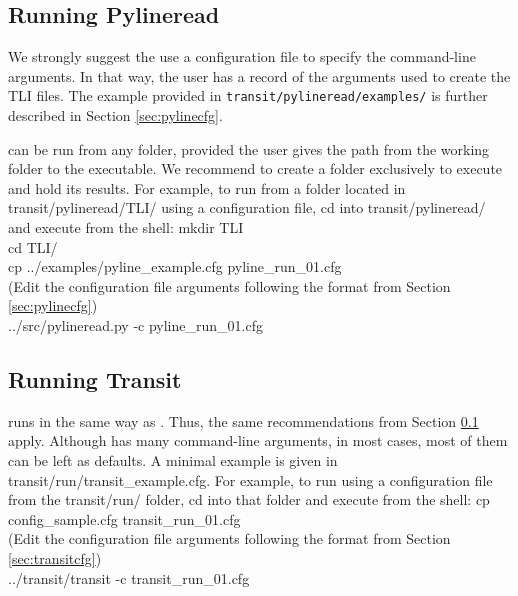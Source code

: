 \documentclass[letterpaper, 12pt]{article}
\begin{document}
\subsection{Running Pylineread}
\label{sec:runpyline}

We strongly suggest the use a configuration file to specify the
command-line arguments.  In that way, the user has a record of the
arguments used to create the TLI files.  The example provided in
\texttt{transit/pylineread/examples/} is further described in
Section \ref{sec:pylinecfg}.

{\pylineread} can be run from any folder, provided the user gives the
path from the working folder to the executable.  We recommend to
create a folder exclusively to execute {\pylineread} and hold its
results.  For example, to run {\pylineread} from a folder located in
{\tttm transit/pylineread/TLI/} using a configuration file, cd into
{\tttm transit/pylineread/} and execute from the shell: \newline
{\tttb mkdir TLI} \\
{\tttb cd TLI/}   \\
{\tttb cp ../examples/pyline\_example.cfg pyline\_run\_01.cfg} \\
(Edit the configuration file arguments following the format from
  Section \ref{sec:pylinecfg}) \\
{\tttb ../src/pylineread.py -c pyline\_run\_01.cfg} \\

\subsection{Running Transit}

{\transit} runs in the same way as {\pylineread}.  Thus, the same
recommendations from Section \ref{sec:runpyline} apply.  Although
{\transit} has many command-line arguments, in most cases, most of
them can be left as defaults.  A minimal example is given in {\tttm
  transit/run/transit\_example.cfg}. For example, to run {\transit}
using a configuration file from the {\tttm transit/run/} folder, cd
into that folder and execute from the shell:\newline
{\tttb cp config\_sample.cfg  transit\_run\_01.cfg} \\
(Edit the configuration file arguments following the format from
  Section \ref{sec:transitcfg}) \\
{\tttb ../transit/transit -c transit\_run\_01.cfg} \\
\end{document}
